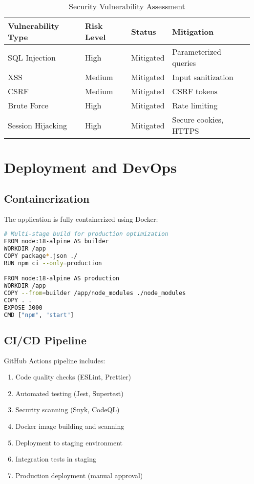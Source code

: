 \documentclass[12pt,a4paper]{article}
\begin{document}
\begin{table}[H]
    \centering
    \begin{tabular}{|l|l|l|l|}
        \hline
        \textbf{Vulnerability Type} & \textbf{Risk Level} & \textbf{Status} & \textbf{Mitigation} \\
        \hline
        SQL Injection & High & Mitigated & Parameterized queries \\
        \hline
        XSS & Medium & Mitigated & Input sanitization \\
        \hline
        CSRF & Medium & Mitigated & CSRF tokens \\
        \hline
        Brute Force & High & Mitigated & Rate limiting \\
        \hline
        Session Hijacking & High & Mitigated & Secure cookies, HTTPS \\
        \hline
    \end{tabular}
    \caption{Security Vulnerability Assessment}
    \label{tab:security}
\end{table}

\section{Deployment and DevOps}

\subsection{Containerization}

The application is fully containerized using Docker:

\begin{lstlisting}[language=bash, caption=Docker Configuration]
# Multi-stage build for production optimization
FROM node:18-alpine AS builder
WORKDIR /app
COPY package*.json ./
RUN npm ci --only=production

FROM node:18-alpine AS production
WORKDIR /app
COPY --from=builder /app/node_modules ./node_modules
COPY . .
EXPOSE 3000
CMD ["npm", "start"]
\end{lstlisting}

\subsection{CI/CD Pipeline}

GitHub Actions pipeline includes:

\begin{enumerate}
    \item Code quality checks (ESLint, Prettier)
    \item Automated testing (Jest, Supertest)
    \item Security scanning (Snyk, CodeQL)
    \item Docker image building and scanning
    \item Deployment to staging environment
    \item Integration tests in staging
    \item Production deployment (manual approval)
\end{enumerate}
\end{document}
